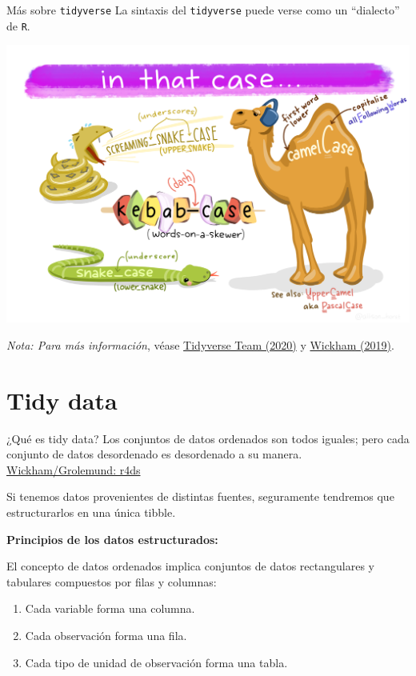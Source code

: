 \documentclass[
  ignorenonframetext,
  aspectratio=169]{beamer}
\begin{document}
\begin{frame}[fragile]{Más sobre \texttt{tidyverse}}
\label{muxe1s-sobre-tidyverse-2}
La sintaxis del \texttt{tidyverse} puede verse como un ``dialecto'' de
\texttt{R}.

\begin{center}\includegraphics[width=0.4\linewidth]{Imgs/serpiente_camello} \end{center}

\emph{Nota: Para más información}, véase
\href{https://design.tidyverse.org/}{Tidyverse Team (2020)} y
\href{https://cran.r-project.org/web/packages/tidyverse/vignettes/manifesto.html}{Wickham
(2019)}.
\end{frame}

\section{Tidy data}\label{tidy-data}

\begin{frame}{¿Qué es tidy data?}
\label{quuxe9-es-tidy-data}
Los conjuntos de datos ordenados son todos iguales; pero cada conjunto
de datos desordenado es desordenado a su manera.
\href{https://r4ds.had.co.nz/tidy-data.html}{Wickham/Grolemund: r4ds}

Si tenemos datos provenientes de distintas fuentes, seguramente
tendremos que estructurarlos en una única tibble.

\textbf{Principios de los datos estructurados:}

El concepto de datos ordenados implica conjuntos de datos rectangulares
y tabulares compuestos por filas y columnas:

\begin{enumerate}
\item
  Cada variable forma una columna.
\item
  Cada observación forma una fila.
\item
  Cada tipo de unidad de observación forma una tabla.
\end{enumerate}
\end{frame}
\end{document}
